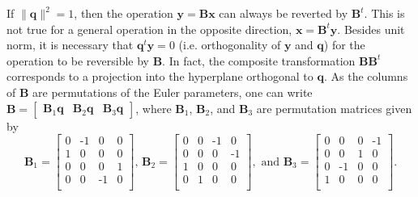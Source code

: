 \documentclass[aip,jcp,reprint,amsmath,amssymb,raggedbottom]{revtex4-1}
\newcommand{\mt}[1]{\boldsymbol{\mathbf{#1}}}           %
\newcommand{\vt}[1]{\boldsymbol{\mathbf{#1}}}           %
\newcommand{\tr}[1]{#1^t}                               %
\begin{document}
If $\lVert \vt q \lVert^2 = 1$, then the operation $\vt y = \mt B \vt x$ can always be reverted by $\tr{\mt B}$. This is not true for a general operation in the opposite direction, $\vt x = \tr{\mt B} \vt y$. Besides unit norm, it is necessary that $\tr{\vt q}\vt y = 0$ (i.e. orthogonality of $\vt y$ and $\vt q$) for the operation to be reversible by $\mt B$. In fact, the composite transformation $\mt B\tr{\mt B}$ corresponds to a projection into the hyperplane orthogonal to $\vt q$.\cite{Dichmann1999} As the columns of $\mt B$ are permutations of the Euler parameters, one can write $\mt B = [\begin{array}{ccc}{\mt B}_1{\vt q} & {\mt B}_2{\vt q} & {\mt B}_3{\vt q}\end{array}]$, where $\mt B_1$, $\mt B_2$, and $\mt B_3$ are permutation matrices given by
\[
{\mt B}_1 = \left[ \begin{smallmatrix}
 0 & \text{-}1 &  0 &  0 \\
 1 &  0 &  0 &  0 \\
 0 &  0 &  0 &  1 \\
 0 &  0 & \text{-}1 &  0 \\
\end{smallmatrix} \right], \,
{\mt B}_2 = \left[ \begin{smallmatrix}
 0 &  0 & \text{-}1 &  0 \\
 0 &  0 &  0 & \text{-}1 \\
 1 &  0 &  0 &  0 \\
 0 &  1 &  0 &  0 \\
\end{smallmatrix} \right], \text{ and }
{\mt B}_3 = \left[ \begin{smallmatrix}
 0 &  0 &  0 & \text{-}1 \\
 0 &  0 &  1 &  0 \\
 0 & \text{-}1 &  0 &  0 \\
 1 &  0 &  0 &  0 \\
\end{smallmatrix} \right].
\]

\end{document}
